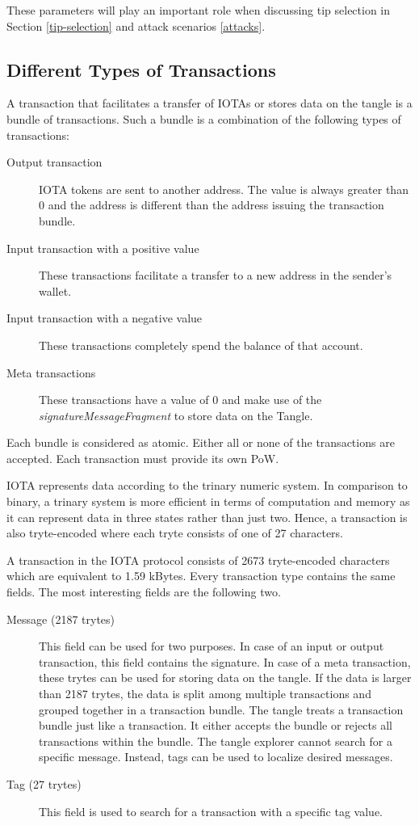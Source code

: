 These parameters will play an important role when discussing tip selection in Section \ref{tip-selection} and attack scenarios \ref{attacks}.

\subsection{Different Types of Transactions}\label{different-types-of-transactions}

A transaction that facilitates a transfer of IOTAs or stores data on the tangle is a bundle of transactions. Such a bundle is a combination of the following types of transactions:
\begin{description}
    \item[Output transaction] IOTA tokens are sent to another address. The value is always greater than 0 and the address is different than the address issuing the transaction bundle.
    \item[Input transaction with a positive value] These transactions facilitate a transfer to a new address in the sender's wallet.
    \item[Input transaction with a negative value] These transactions completely spend the balance of that account.
    \item[Meta transactions] These transactions have a value of 0 and make use of the \textit{signatureMessageFragment} to store data on the Tangle. 
\end{description}

Each bundle is considered as atomic. Either all or none of the transactions are accepted. Each transaction must provide its own PoW. 


IOTA represents data according to the trinary numeric system. In comparison to binary, a trinary system is more efficient in terms of computation and memory as it can represent data in three states rather than just two. Hence, a transaction is also tryte-encoded where each tryte consists of one of 27 characters.

A transaction in the IOTA protocol consists of 2673 tryte-encoded characters which are equivalent to 1.59 kBytes. Every transaction type contains the same fields. The most interesting fields are the following two.
\begin{description}
    \item[Message (2187 trytes)] This field can be used for two purposes. In case of an input or output transaction, this field contains the signature. In case of a meta transaction, these trytes can be used for storing data on the tangle. If the data is larger than 2187 trytes, the data is split among multiple transactions and grouped together in a transaction bundle. The tangle treats a transaction bundle just like a transaction. It either accepts the bundle or rejects all transactions within the bundle. The tangle explorer cannot search for a specific message. Instead, tags can be used to localize desired messages.
    \item[Tag (27 trytes)] This field is used to search for a transaction with a specific tag value.
\end{description}

